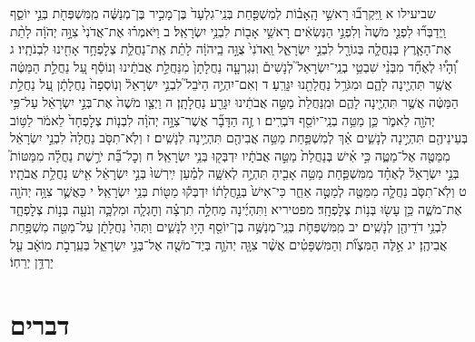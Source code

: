 \documentclass[twoside, openany, parskip=half, 11pt]{book}
\begin{document}
שביעילו א וַֽיִּקְרְב֞וּ רָאשֵׁ֣י הָֽאָב֗וֹת לְמִשְׁפַּ֤חַת בְּנֵֽי־גִלְעָד֙ בֶּן־מָכִ֣יר בֶּן־מְנַשֶּׁ֔ה מִֽמִּשְׁפְּחֹ֖ת בְּנֵ֣י יוֹסֵ֑ף וַֽיְדַבְּר֞וּ לִפְנֵ֤י מֹשֶׁה֙ וְלִפְנֵ֣י הַנְּשִׂאִ֔ים רָאשֵׁ֥י אָב֖וֹת לִבְנֵ֥י יִשְׂרָאֵֽל׃ ב וַיֹּאמְר֗וּ אֶת־אֲדֹנִי֙ צִוָּ֣ה יְהֹוָ֔ה לָתֵ֨ת אֶת־הָאָ֧רֶץ בְּנַחֲלָ֛ה בְּגוֹרָ֖ל לִבְנֵ֣י יִשְׂרָאֵ֑ל וַֽאדֹנִי֙ צֻוָּ֣ה בַֽיהֹוָ֔ה לָתֵ֗ת אֶֽת־נַחֲלַ֛ת צְלׇפְחָ֥ד אָחִ֖ינוּ לִבְנֹתָֽיו׃ ג וְ֠הָי֠וּ לְאֶחָ֞ד מִבְּנֵ֨י שִׁבְטֵ֥י בְנֵֽי־יִשְׂרָאֵל֮ לְנָשִׁים֒ וְנִגְרְעָ֤ה נַחֲלָתָן֙ מִנַּחֲלַ֣ת אֲבֹתֵ֔ינוּ וְנוֹסַ֕ף עַ֚ל נַחֲלַ֣ת הַמַּטֶּ֔ה אֲשֶׁ֥ר תִּהְיֶ֖ינָה לָהֶ֑ם וּמִגֹּרַ֥ל נַחֲלָתֵ֖נוּ יִגָּרֵֽעַ׃ ד וְאִם־יִהְיֶ֣ה הַיֹּבֵל֮ לִבְנֵ֣י יִשְׂרָאֵל֒ וְנֽוֹסְפָה֙ נַחֲלָתָ֔ן עַ֚ל נַחֲלַ֣ת הַמַּטֶּ֔ה אֲשֶׁ֥ר תִּהְיֶ֖ינָה לָהֶ֑ם וּמִֽנַּחֲלַת֙ מַטֵּ֣ה אֲבֹתֵ֔ינוּ יִגָּרַ֖ע נַחֲלָתָֽן׃ ה וַיְצַ֤ו מֹשֶׁה֙ אֶת־בְּנֵ֣י יִשְׂרָאֵ֔ל עַל־פִּ֥י יְהֹוָ֖ה לֵאמֹ֑ר כֵּ֛ן מַטֵּ֥ה בְנֵֽי־יוֹסֵ֖ף דֹּבְרִֽים׃ ו זֶ֣ה הַדָּבָ֞ר אֲשֶׁר־צִוָּ֣ה יְהֹוָ֗ה לִבְנ֤וֹת צְלׇפְחָד֙ לֵאמֹ֔ר לַטּ֥וֹב בְּעֵינֵיהֶ֖ם תִּהְיֶ֣ינָה לְנָשִׁ֑ים אַ֗ךְ לְמִשְׁפַּ֛חַת מַטֵּ֥ה אֲבִיהֶ֖ם תִּהְיֶ֥ינָה לְנָשִֽׁים׃ ז וְלֹֽא־תִסֹּ֤ב נַחֲלָה֙ לִבְנֵ֣י יִשְׂרָאֵ֔ל מִמַּטֶּ֖ה אֶל־מַטֶּ֑ה כִּ֣י אִ֗ישׁ בְּנַחֲלַת֙ מַטֵּ֣ה אֲבֹתָ֔יו יִדְבְּק֖וּ בְּנֵ֥י יִשְׂרָאֵֽל׃ ח וְכׇל־בַּ֞ת יֹרֶ֣שֶׁת נַחֲלָ֗ה מִמַּטּוֹת֮ בְּנֵ֣י יִשְׂרָאֵל֒ לְאֶחָ֗ד מִמִּשְׁפַּ֛חַת מַטֵּ֥ה אָבִ֖יהָ תִּהְיֶ֣ה לְאִשָּׁ֑ה לְמַ֗עַן יִֽירְשׁוּ֙ בְּנֵ֣י יִשְׂרָאֵ֔ל אִ֖ישׁ נַחֲלַ֥ת אֲבֹתָֽיו׃ ט וְלֹֽא־תִסֹּ֧ב נַחֲלָ֛ה מִמַּטֶּ֖ה לְמַטֶּ֣ה אַחֵ֑ר כִּי־אִישׁ֙ בְּנַ֣חֲלָת֔וֹ יִדְבְּק֕וּ מַטּ֖וֹת בְּנֵ֥י יִשְׂרָאֵֽל׃ י כַּאֲשֶׁ֛ר צִוָּ֥ה יְהֹוָ֖ה אֶת־מֹשֶׁ֑ה כֵּ֥ן עָשׂ֖וּ בְּנ֥וֹת צְלׇפְחָֽד׃ מפטיריא וַתִּהְיֶ֜ינָה מַחְלָ֣ה תִרְצָ֗ה וְחׇגְלָ֧ה וּמִלְכָּ֛ה וְנֹעָ֖ה בְּנ֣וֹת צְלׇפְחָ֑ד לִבְנֵ֥י דֹדֵיהֶ֖ן לְנָשִֽׁים׃ יב מִֽמִּשְׁפְּחֹ֛ת בְּנֵֽי־מְנַשֶּׁ֥ה בֶן־יוֹסֵ֖ף הָי֣וּ לְנָשִׁ֑ים וַתְּהִי֙ נַחֲלָתָ֔ן עַל־מַטֵּ֖ה מִשְׁפַּ֥חַת אֲבִיהֶֽן׃ יג אֵ֣לֶּה הַמִּצְוֺ֞ת וְהַמִּשְׁפָּטִ֗ים אֲשֶׁ֨ר צִוָּ֧ה יְהֹוָ֛ה בְּיַד־מֹשֶׁ֖ה אֶל־בְּנֵ֣י יִשְׂרָאֵ֑ל בְּעַֽרְבֹ֣ת מוֹאָ֔ב עַ֖ל יַרְדֵּ֥ן יְרֵחֽוֹ׃ 

\chapter[דברים]{דברים}
\end{document}
